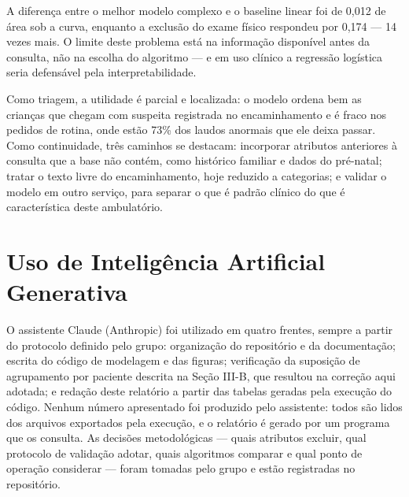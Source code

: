 \documentclass[conference]{IEEEtran}
\begin{document}
A diferença entre o melhor modelo complexo e o baseline linear foi de 0,012 de área sob a curva, enquanto a exclusão do exame físico respondeu por 0,174 --- 14 vezes mais. O limite deste problema está na informação disponível antes da consulta, não na escolha do algoritmo --- e em uso clínico a regressão logística seria defensável pela interpretabilidade.

Como triagem, a utilidade é parcial e localizada: o modelo ordena bem as crianças que chegam com suspeita registrada no encaminhamento e é fraco nos pedidos de rotina, onde estão 73\% dos laudos anormais que ele deixa passar. Como continuidade, três caminhos se destacam: incorporar atributos anteriores à consulta que a base não contém, como histórico familiar e dados do pré-natal; tratar o texto livre do encaminhamento, hoje reduzido a categorias; e validar o modelo em outro serviço, para separar o que é padrão clínico do que é característica deste ambulatório.

\section{Uso de Inteligência Artificial Generativa}
O assistente Claude (Anthropic) foi utilizado em quatro frentes, sempre a partir do protocolo definido pelo grupo: organização do repositório e da documentação; escrita do código de modelagem e das figuras; verificação da suposição de agrupamento por paciente descrita na Seção III-B, que resultou na correção aqui adotada; e redação deste relatório a partir das tabelas geradas pela execução do código. Nenhum número apresentado foi produzido pelo assistente: todos são lidos dos arquivos exportados pela execução, e o relatório é gerado por um programa que os consulta. As decisões metodológicas --- quais atributos excluir, qual protocolo de validação adotar, quais algoritmos comparar e qual ponto de operação considerar --- foram tomadas pelo grupo e estão registradas no repositório.
\end{document}
